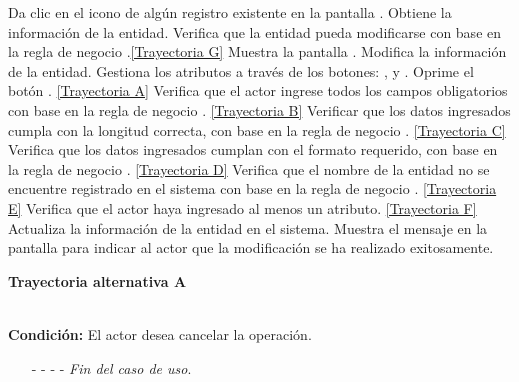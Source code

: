 	\begin{UCtrayectoria}
		\UCpaso[\UCactor] Da clic en el icono \editar de algún registro existente en la pantalla .
		\UCpaso[\UCsist] Obtiene la información de la entidad.
		\UCpaso[\UCsist] Verifica que la entidad pueda modificarse con base en la regla de negocio .\hyperlink{CU7-2:TAG}{[Trayectoria G]}
		\UCpaso[\UCsist] Muestra la pantalla . \label{CU7.2-P4}
		\UCpaso[\UCactor] Modifica la información de la entidad. \label{CU7.2-P5}
		\UCpaso[\UCactor] Gestiona los atributos a través de los botones: , \editar y \eliminar. \label{CU7.2-P6}
		\UCpaso[\UCactor] Oprime el botón . \hyperlink{CU7-2:TAA}{[Trayectoria A]}
		\UCpaso[\UCsist] Verifica que el actor ingrese todos los campos obligatorios con base en la regla de negocio . \hyperlink{CU7-2:TAB}{[Trayectoria B]}
		\UCpaso[\UCsist] Verificar que los datos ingresados cumpla con la longitud correcta, con base en la regla de negocio . \hyperlink{CU7-2:TAC}{[Trayectoria C]}
		\UCpaso[\UCsist] Verifica que los datos ingresados cumplan con el formato requerido, con base en la regla de negocio . \hyperlink{CU7-2:TAD}{[Trayectoria D]}
		\UCpaso[\UCsist] Verifica que el nombre de la entidad no se encuentre registrado en el sistema con base en la regla de negocio . \hyperlink{CU7-2:TAE}{[Trayectoria E]} 
		\UCpaso[\UCsist] Verifica que el actor haya ingresado al menos un atributo. \hyperlink{CU7-2:TAF}{[Trayectoria F]}
		\UCpaso[\UCsist] Actualiza la información de la entidad en el sistema.
		\UCpaso[\UCsist] Muestra el mensaje  en la pantalla  para indicar al actor que la modificación se ha realizado exitosamente.
	\end{UCtrayectoria}		
\hypertarget{CU7-2:TAA}{\textbf{Trayectoria alternativa A}}\\
\noindent \textbf{Condición:} El actor desea cancelar la operación.
\begin{enumerate}
	\UCpaso[\UCactor] Solicita cancelar la operación oprimiendo el botón  de la pantalla 
	\UCpaso[\UCsist] Muestra la pantalla .
	\item[- -] - - {\em {Fin del caso de uso}}.%
\end{enumerate}
